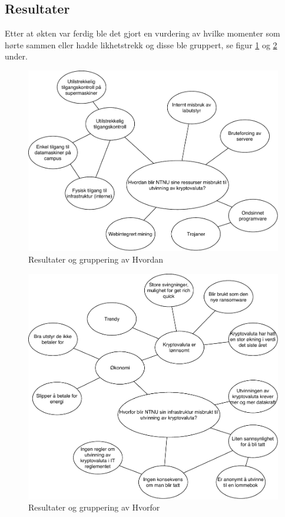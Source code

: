 \subsection{Resultater}
Etter at økten var ferdig ble det gjort en vurdering av hvilke momenter som hørte sammen eller hadde likhetstrekk og disse ble gruppert, se figur \ref{fig:idemyldring-hvordan} og \ref{fig:idemyldring-hvorfor} under.




\begin{figure}[H]
    \centering
    \includegraphics[scale=0.5]{case_3/bilder/idemyldring-hvordan.pdf}
    \caption[Idémyldring]{Resultater og gruppering av Hvordan}
     \label{fig:idemyldring-hvordan}
\end{figure}

\begin{figure}[H]
    \centering
    \includegraphics[scale=0.5]{case_3/bilder/idemyldring-hvorfor.pdf}
    \caption[Idémyldring]{Resultater og gruppering av Hvorfor}
    \label{fig:idemyldring-hvorfor}
\end{figure}

